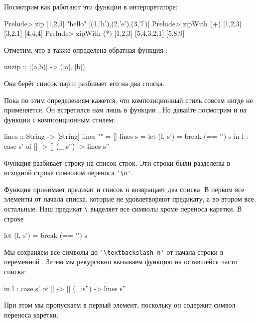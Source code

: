 Посмотрим как работают эти функции в интерпретаторе:

\begin{code}
Prelude> zip [1,2,3] "hello"
[(1,'h'),(2,'e'),(3,'l')]
Prelude> zipWith (+) [1,2,3] [3,2,1]
[4,4,4]
Prelude> zipWith (*) [1,2,3] [5,4,3,2,1]
[5,8,9]
\end{code}

Отметим, что в  также определена обратная функция :

\begin{code}
unzip   :: [(a,b)] -> ([a], [b]) 
\end{code}

Она берёт список пар и разбивает его на два списка.

Пока по этим определениям кажется, что композиционный стиль 
совсем нигде не применяется. Он встретился нам лишь в функции
. Но давайте посмотрим и на функции
с композиционным стилем:

\begin{code}
lines            :: String -> [String]
lines ""         =  []
lines s          =  let (l, s') = break (== '\n') s
                    in  l : case s' of
                              []      -> []
                              (_:s'') -> lines s''
\end{code}

Функция  разбивает строку на список строк. 
Эти строки были разделены в исходной строке 
символом переноса \verb!'\n'!. 

Функция  принимает предикат и список 
и возвращает два списка. В первом все элементы от начала
списка, которые не удовлетворяют предикату, а во втором все остальные.
Наш предикат \verb!\! выделяет все символы 
кроме переноса каретки. В строке 

\begin{code}
let (l, s') = break (== '\n') s
\end{code}

Мы сохраняем все символы до \verb!'\textbackslash n'! от начала
строки в переменной . Затем мы рекурсивно вызываем
функцию  на оставшейся части списка:

\begin{code}
                    in  l : case s' of
                              []      -> []
                              (_:s'') -> lines s''
\end{code}

При этом мы пропускаем в  первый элемент, поскольку
он содержит символ переноса каретки. 

